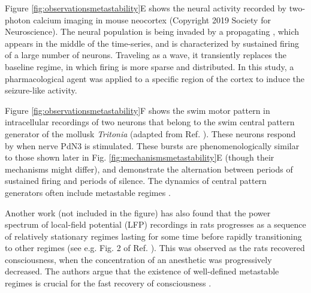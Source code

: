 Figure \ref{fig:observationsmetastability}E shows the neural activity recorded by two-photon calcium imaging in mouse neocortex \cite{wenzel2019acute} (Copyright 2019 Society for Neuroscience). The neural population is being invaded by a propagating , which appears in the middle of the time-series, and is characterized by sustained firing of a large number of neurons. Traveling as a wave, it transiently replaces the baseline regime, in which firing is more sparse and distributed. In this study, a pharmacological agent was applied to a specific region of the cortex to induce the seizure-like activity.



Figure \ref{fig:observationsmetastability}F shows the swim motor pattern in intracellular recordings of two neurons that belong to the swim central pattern generator of the mollusk \textit{Tritonia} \cite{sakurai2016recruitment} (adapted from Ref. \cite{sakurai2016recruitment}). These neurons respond by  when nerve PdN3 is stimulated. These bursts are phenomenologically similar to those shown later in Fig. \ref{fig:mechanismsmetastability}E (though their mechanisms might differ), and demonstrate the alternation between periods of sustained firing and periods of silence. The dynamics of central pattern generators often include metastable regimes \cite{marder2001central}. 

Another work (not included in the figure) has also found that the power spectrum of local-field potential (LFP) recordings in rats progresses as a sequence of relatively stationary regimes lasting for some time before rapidly transitioning to other regimes \cite{hudson2014recovery} (see e.g. Fig. 2 of Ref. \cite{hudson2014recovery}). This was observed as the rats recovered consciousness, when the concentration of an anesthetic was progressively decreased. The authors argue that the existence of well-defined metastable regimes is crucial for the fast recovery of consciousness \cite{hudson2014recovery}.

